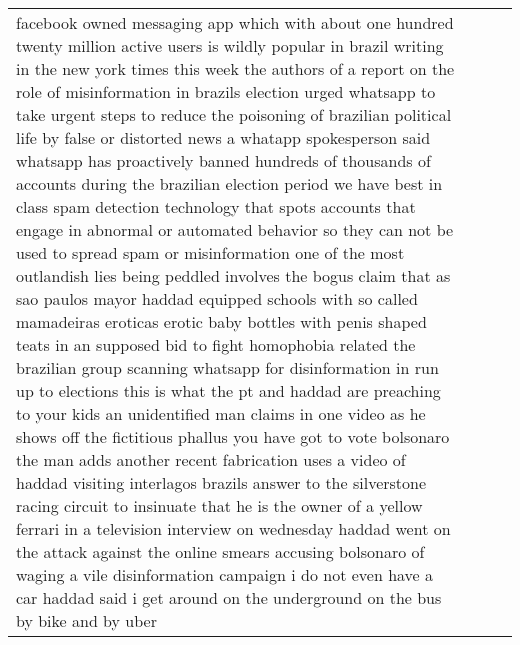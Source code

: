 \documentclass[]{article}
\begin{document}
\begin{table}[!h]
{\begin{tabular}[t]{llll}
facebook owned messaging app which with about one hundred twenty million active users is wildly popular in brazil writing in the new york times this week the authors of a report on the role of misinformation in brazils election urged whatsapp to take urgent steps to reduce the poisoning of brazilian political life by false or distorted news a whatapp spokesperson said whatsapp has proactively banned hundreds of thousands of accounts during the brazilian election period we have best in class spam detection technology that spots accounts that engage in abnormal or automated behavior so they can not be used to spread spam or misinformation one of the most outlandish lies being peddled involves the bogus claim that as sao paulos mayor haddad equipped schools with so called mamadeiras eroticas erotic baby bottles with penis shaped teats in an supposed bid to fight homophobia related the brazilian group scanning whatsapp for disinformation in run up to elections this is what the pt and haddad are preaching to your kids an unidentified man claims in one video as he shows off the fictitious phallus you have got to vote bolsonaro the man adds another recent fabrication uses a video of haddad visiting interlagos brazils answer to the silverstone racing circuit to insinuate that he is the owner of a yellow ferrari in a television interview on wednesday haddad went on the attack against the online smears accusing bolsonaro of waging a vile disinformation campaign i do not even have a car haddad said i get around on the underground on the bus by bike and by uber\\

\end{tabular}}
\end{table}
\end{document}
